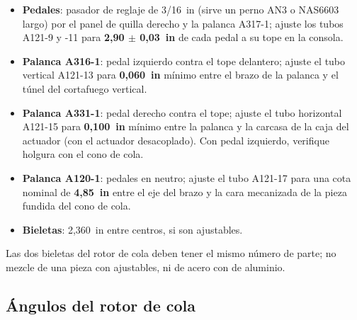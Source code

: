 \begin{itemize}
\item \textbf{Pedales}: pasador de reglaje de 3/16~in (sirve un perno AN3 o NAS6603 largo) por el panel de quilla derecho y la palanca A317-1; ajuste los tubos A121-9 y -11 para \textbf{2,90 $\pm$ 0,03~in} de cada pedal a su tope en la consola.
\item \textbf{Palanca A316-1}: pedal izquierdo contra el tope delantero; ajuste el tubo vertical A121-13 para \textbf{0,060~in} mínimo entre el brazo de la palanca y el túnel del cortafuego vertical.
\item \textbf{Palanca A331-1}: pedal derecho contra el tope; ajuste el tubo horizontal A121-15 para \textbf{0,100~in} mínimo entre la palanca y la carcasa de la caja del actuador (con el actuador desacoplado). Con pedal izquierdo, verifique holgura con el cono de cola.
\item \textbf{Palanca A120-1}: pedales en neutro; ajuste el tubo A121-17 para una cota nominal de \textbf{4,85~in} entre el eje del brazo y la cara mecanizada de la pieza fundida del cono de cola.
\item \textbf{Bieletas}: 2,360~in entre centros, si son ajustables.
\end{itemize}

\begin{advertencia}
Las dos bieletas del rotor de cola deben tener el mismo número de parte; no mezcle de una pieza con ajustables, ni de acero con de aluminio.
\end{advertencia}

\subsection{Ángulos del rotor de cola}

